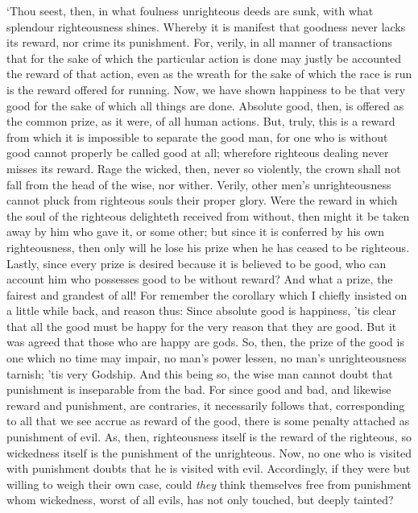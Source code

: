 \documentclass[12pt]{book}
\begin{document}
`Thou seest, then, in what foulness unrighteous deeds are sunk, with
what splendour righteousness shines. Whereby it is manifest that
goodness never lacks its reward, nor crime its punishment. For, verily,
in all manner of transactions that for the sake of which the particular
action is done may justly be accounted the reward of that action, even
as the wreath for the sake of which the race is run is the reward
offered for running. Now, we have shown happiness to be that very good
for the sake of which all things are done. Absolute good, then, is
offered as the common prize, as it were, of all human actions. But,
truly, this is a reward from which it is impossible to separate the good
man, for one who is without good cannot properly be called good at all;
wherefore righteous dealing never misses its reward. Rage the wicked,
then, never so violently, the crown shall not fall from the head of the
wise, nor wither. Verily, other men's unrighteousness cannot pluck from
righteous souls their proper glory. Were the reward in which the soul of
the righteous delighteth received from without, then might it be taken
away by him who gave it, or some other; but since it is conferred by his
own righteousness, then only will he lose his prize when he has ceased
to be righteous. Lastly, since every prize is desired because it is
believed to be good, who can account him who possesses good to be
without reward? And what a prize, the fairest and grandest of all! For
remember the corollary which I chiefly insisted on a little while back,
and reason thus: Since absolute good is happiness, 'tis clear that all
the good must be happy for the very reason that they are good. But it
was agreed that those who are happy are gods. So, then, the prize of the
good is one which no time may impair, no man's power lessen, no man's
unrighteousness tarnish; 'tis very Godship. And this being so, the wise
man cannot doubt that punishment is inseparable from the bad. For since
good and bad, and likewise reward and punishment, are contraries, it
necessarily follows that, corresponding to all that we see accrue as
reward of the good, there is some penalty attached as punishment of
evil. As, then, righteousness itself is the reward of the righteous, so
wickedness itself is the punishment of the unrighteous. Now, no one who
is visited with punishment doubts that he is visited with evil.
Accordingly, if they were but willing to weigh their own case, could
\emph{they} think themselves free from punishment whom wickedness, worst of
all evils, has not only touched, but deeply tainted?
\end{document}
